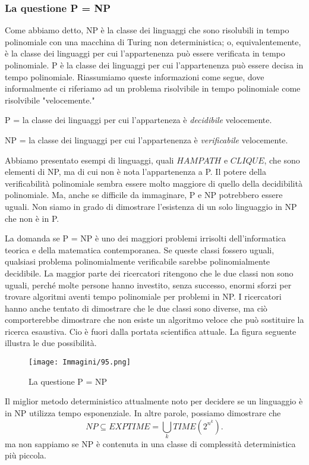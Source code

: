 \documentclass{article}
\begin{document}
\subsubsection*{La questione P = NP}
Come abbiamo detto, NP è la classe dei linguaggi che sono risolubili in tempo polinomiale con una macchina di Turing non deterministica; 
o, equivalentemente, è la classe dei linguaggi per cui l'appartenenza può essere verificata in tempo polinomiale. 
P è la classe dei linguaggi per cui l'appartenenza può essere decisa in tempo polinomiale. 
Riassumiamo queste informazioni come segue, dove informalmente ci riferiamo ad un problema risolvibile in tempo polinomiale come risolvibile "velocemente."
\begin{center}
    P = la classe dei linguaggi per cui l'apparteneza è \textit{decidibile} velocemente.

    NP = la classe dei linguaggi per cui l'appartenenza è \textit{verificabile} velocemente.
\end{center}
Abbiamo presentato esempi di linguaggi, quali $HAMPATH$ e $CLIQUE$, che
sono elementi di NP, ma di cui non è nota l'appartenenza a P. 
Il potere della verificabilità polinomiale sembra essere molto maggiore di quello della decidibilità polinomiale. 
Ma, anche se difficile da immaginare, P e NP potrebbero essere uguali. 
Non siamo in grado di dimostrare l'esistenza di un solo linguaggio in NP che non è in P.

La domanda se P = NP è uno dei maggiori problemi irrisolti dell'informatica teorica e della matematica contemporanea. 
Se queste classi fossero uguali, qualsiasi problema polinomialmente verificabile sarebbe polinomialmente decidibile. 
La maggior parte dei ricercatori ritengono che le due classi non sono uguali, perché molte persone hanno investito, senza successo, enormi sforzi per trovare algoritmi aventi tempo polinomiale per problemi in NP. 
I ricercatori hanno anche tentato di dimostrare che le due classi sono diverse, ma ciò comporterebbe dimostrare che non esiste un algoritmo veloce che può sostituire la ricerca esaustiva.
Cio è fuori dalla portata scientifica attuale. 
La figura seguente illustra le due possibilità.
\begin{figure}[H]
    \centering
    \texttt{[image: Immagini/95.png]}
    \caption{La questione P = NP}
    \label{fig:p-np}
\end{figure}
Il miglior metodo deterministico attualmente noto per decidere se un linguaggio è in NP utilizza tempo esponenziale. 
In altre parole, possiamo dimostrare che
$$
NP \subseteq EXPTIME = \bigcup_{k} TIME(2^{n^k}).
$$
ma non sappiamo se NP è contenuta in una classe di complessità deterministica più piccola.
\end{document}
